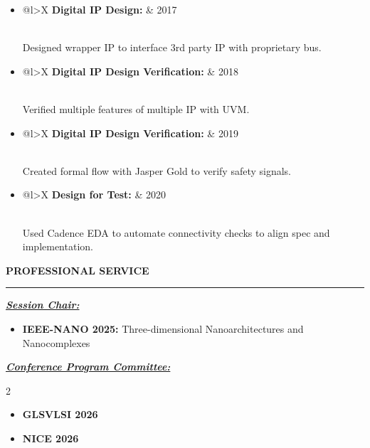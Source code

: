 \documentclass[12pt]{article}
\begin{document}
\begin{itemize}
    \item \begin{tabularx}{\linewidth}{{@{}l>{\raggedleft\arraybackslash}X}}
    \textbf{Digital IP Design:}  & 2017
    \end{tabularx}\\
    Designed wrapper IP to interface 3rd party IP with proprietary bus.
    \item \begin{tabularx}{\linewidth}{{@{}l>{\raggedleft\arraybackslash}X}}
    \textbf{Digital IP Design Verification:}  & 2018
    \end{tabularx}\\
    Verified multiple features of multiple IP with UVM.
    \item \begin{tabularx}{\linewidth}{{@{}l>{\raggedleft\arraybackslash}X}}
    \textbf{Digital IP Design Verification:}  & 2019
    \end{tabularx}\\
    Created formal flow with Jasper Gold to verify safety signals.
    \item \begin{tabularx}{\linewidth}{{@{}l>{\raggedleft\arraybackslash}X}}
    \textbf{Design for Test:}  & 2020
    \end{tabularx}\\
    Used Cadence EDA to automate connectivity checks to align spec and implementation.
\end{itemize}

\vspace{2em}

{\Large \textbf{PROFESSIONAL SERVICE}}

\textcolor{gray}{\rule{\textwidth}{2pt}}

{\large \textit{\textbf{\ul{Session Chair:}}}}

\begin{itemize}
    \item \textbf{IEEE-NANO 2025:} Three-dimensional Nanoarchitectures and Nanocomplexes
\end{itemize}

{\large \textit{\textbf{\ul{Conference Program Committee:}}}}

\begin{multicols}{2}
\begin{itemize}
    \item \textbf{GLSVLSI 2026}
    \item \textbf{NICE 2026}
\end{itemize}
\end{multicols}
\end{document}
